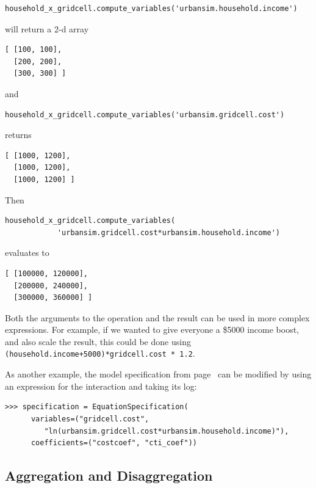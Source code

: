 \begin{verbatim}
household_x_gridcell.compute_variables('urbansim.household.income')
\end{verbatim}

will return a 2-d array

\begin{verbatim}
[ [100, 100],
  [200, 200],
  [300, 300] ]
\end{verbatim}

and

\begin{verbatim}
household_x_gridcell.compute_variables('urbansim.gridcell.cost')
\end{verbatim}

returns

\begin{verbatim}
[ [1000, 1200],
  [1000, 1200],
  [1000, 1200] ]
\end{verbatim}

Then
\begin{verbatim}
household_x_gridcell.compute_variables(
            'urbansim.gridcell.cost*urbansim.household.income')
\end{verbatim}

evaluates to
\begin{verbatim}
[ [100000, 120000],
  [200000, 240000],
  [300000, 360000] ]
\end{verbatim}

Both the arguments to the operation and the result can be used in more
complex expressions.  For example, if we wanted to give everyone
a \$5000 income boost, and also scale the result, this could be done using
\verb|(household.income+5000)*gridcell.cost * 1.2|.

As another example, the model specification from
page~\pageref{page:iv-spec} can be modified by using an expression for the
interaction and taking its log: \variablesindex \coefficientsindex

\begin{verbatim}
>>> specification = EquationSpecification(
      variables=("gridcell.cost",
         "ln(urbansim.gridcell.cost*urbansim.household.income)"),
      coefficients=("costcoef", "cti_coef"))
\end{verbatim}


\subsection{Aggregation and Disaggregation}
\label{sec:aggregation}
 

